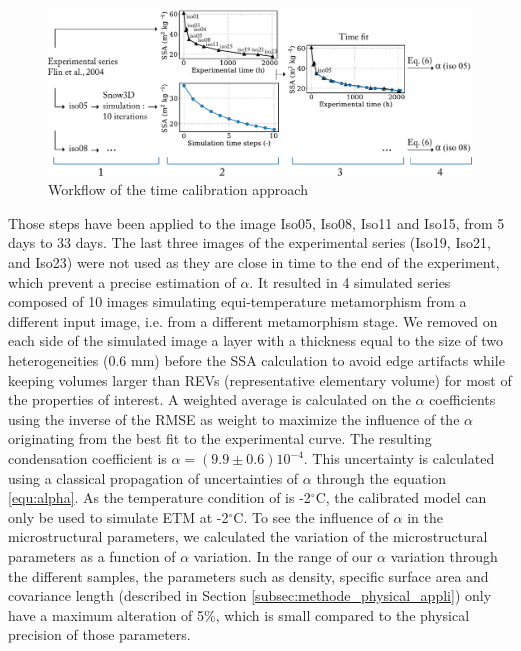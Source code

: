 \documentclass[draft,ms]{agujournal2019}
\begin{document}
\hspace*{-0.2cm}
\begin{figure}
    \centering
    \includegraphics[width = \linewidth]{Figures/workflow_aff.pdf}
    \caption{Workflow of the time calibration approach}
    \label{fig:workflow}
\end{figure}
Those steps have been applied to the image Iso05, Iso08, Iso11 and Iso15, from 5 days to 33 days. The last three images of the experimental series (Iso19, Iso21, and Iso23) were not used as they are close in time to the end of the experiment, which prevent a precise estimation of $\alpha$. It resulted in 4 simulated series composed of 10 images simulating equi-temperature metamorphism from a different input image, i.e. from a different metamorphism stage. We removed on each side of the simulated image a layer with a thickness equal to the size of two heterogeneities (0.6 mm) before the SSA calculation to avoid edge artifacts while keeping volumes larger than REVs (representative elementary volume) for most of the properties of interest. A weighted average is calculated on the $\alpha$ coefficients using the inverse of the RMSE as weight to maximize the influence of the $\alpha$ originating from the best fit to the experimental curve. The resulting condensation coefficient is $\alpha = ( 9.9 \pm 0.6) 10^{-4}$. This uncertainty is calculated using a classical propagation of uncertainties of $\alpha$ through the equation \eqref{equ:alpha}. As the temperature condition of  is -2$^\circ$C, the calibrated model can only be used to simulate ETM at -2$^\circ$C. To see the influence of $\alpha$ in the microstructural parameters, we calculated the variation of the microstructural parameters as a function of $\alpha$ variation. In the range of our $\alpha$ variation through the different samples, the parameters such as density, specific surface area and covariance length (described in Section \ref{subsec:methode_physical_appli}) only have a maximum alteration of 5\%, which is small compared to the physical precision of those parameters. 
\end{document}
